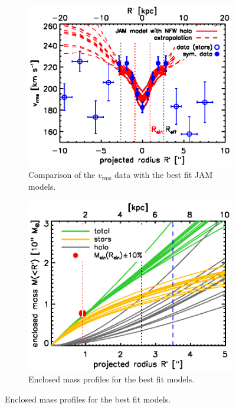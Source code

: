 \documentclass[useAMS,usenatbib]{mnras}
\begin{document}

\begin{figure}
\centering
\begin{subfigure}{.48\textwidth}
  \centering
  \includegraphics[width=0.9\linewidth]{B4_rms_error_curves.ps}
  \caption{Comparison of the $v_\text{rms}$ data with the best fit JAM models.}
  \label{fig:modelB4_vrms}
\end{subfigure}%
\hspace{.02\textwidth}
\begin{subfigure}{.48\textwidth}
  \centering
  \includegraphics[width=0.9\linewidth]{B4_jam_profiles_errors_short_projmass.ps}
  \caption{Enclosed mass profiles for the best fit models.}

\end{subfigure}
\end{figure}
\end{document}
